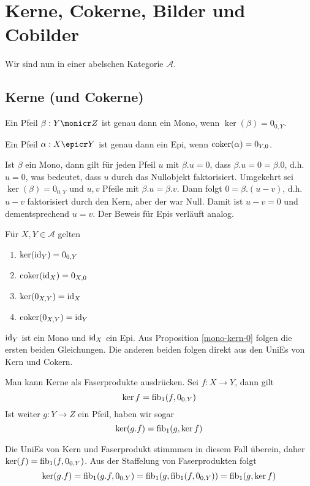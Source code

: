 \section{Kerne, Cokerne, Bilder und Cobilder}

Wir sind nun in einer abelschen Kategorie $\mathcal A$.

\subsection{Kerne (und Cokerne)}


\begin{prop}\label{mono-kern-0}
Ein Pfeil $\beta : Y \monicr Z$ ist genau dann ein Mono, wenn $\ker(\beta) = 0_{0,Y}$.

Ein Pfeil $\alpha : X \epicr Y$ ist genau dann ein Epi, wenn $\operatorname{coker}(\alpha) = 0_{Y,0}$.
\end{prop}
\begin{bew}
Ist $\beta$ ein Mono, dann gilt für jeden Pfeil $u$ mit $\beta.u = 0$, dass $\beta.u = 0 = \beta.0$, d.h. $u = 0$, was bedeutet, dass $u$ durch das Nullobjekt faktorisiert. 
Umgekehrt sei $\ker(\beta) = 0_{0,Y}$ und $u,v$ Pfeile mit $\beta.u = \beta.v$. Dann folgt $0 = \beta.(u-v)$, d.h. $u-v$ faktorisiert durch den Kern, aber der war Null. Damit ist $u-v = 0$ und dementsprechend $u=v$.
Der Beweis für Epis verläuft analog.
\end{bew}

\begin{prop}\label{ker-examples}
Für $X,Y \in \mathcal A$ gelten
\begin{enumerate}
\item $\ker(\operatorname{id}_Y) = 0_{0,Y}$
\item $\operatorname{coker}(\operatorname{id}_X) = 0_{X,0}$
\item $\ker(0_{X,Y}) = \operatorname{id}_X$
\item $\operatorname{coker}(0_{X,Y}) = \operatorname{id}_Y$
\end{enumerate}
\end{prop}
\begin{bew}
$\operatorname{id}_Y$ ist ein Mono und $\operatorname{id}_X$ ein Epi. Aus Proposition \ref{mono-kern-0} folgen die ersten beiden Gleichungen. Die anderen beiden folgen direkt aus den UniEs von Kern und Cokern.
\end{bew}



\begin{prop}\label{ker-is-fibre}
Man kann Kerne als Faserprodukte ausdrücken. Sei $f : X\to Y$, dann gilt
\[\ker f = \operatorname{fib}_1(f,0_{0,Y}) \]
Ist weiter $g : Y\to Z$ ein Pfeil, haben wir sogar
\[ \ker(g.f) = \operatorname{fib}_1(g,\ker f) \]
\end{prop}
\begin{bew}
Die UniEs von Kern und Faserprodukt stimmmen in diesem Fall überein, daher $\ker(f) = \operatorname{fib}_1(f,0_{0,Y})$.
Aus der Staffelung von Faserprodukten folgt
\[\ker(g.f) = \operatorname{fib}_1(g.f,0_{0,Y}) = \operatorname{fib}_1(g,\operatorname{fib}_1(f,0_{0,Y})) = \operatorname{fib}_1(g,\ker f)\]
\end{bew}

